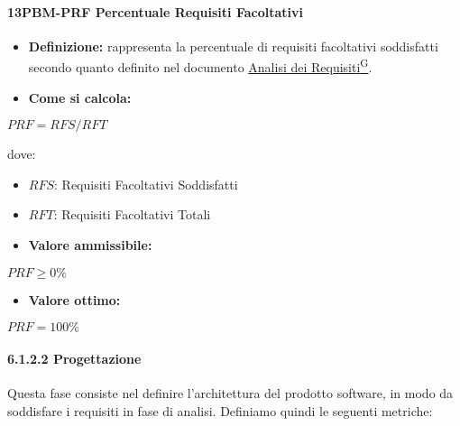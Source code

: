 \paragraph*{13PBM-PRF Percentuale Requisiti Facoltativi}
\begin{itemize}
    \item \textbf{Definizione:} rappresenta la percentuale di requisiti facoltativi soddisfatti secondo quanto definito nel documento \href{https://code7crusaders.github.io/docs/PB/documentazione_interna/glossario.html#analisi-dei-requisiti}{Analisi dei Requisiti\textsuperscript{G}}.
    \item \textbf{Come si calcola:}
\end{itemize}
\begin{center}
   $PRF = RFS/RFT$ 
\end{center}
dove:
\begin{itemize}[label=$\rightarrow$]
    \item $RFS$: Requisiti Facoltativi Soddisfatti
    \item $RFT$: Requisiti Facoltativi Totali
\end{itemize}
\begin{itemize}
    \item \textbf{Valore ammissibile:}
\end{itemize}
\begin{center}
    $PRF \geq 0\%$
\end{center}
\begin{itemize}
    \item \textbf{Valore ottimo:}
\end{itemize}
\begin{center}
    $PRF = 100\%$
\end{center}

\paragraph*{6.1.2.2 Progettazione}
Questa fase consiste nel definire l'architettura  del prodotto software, in modo da soddisfare i requisiti in fase di analisi. Definiamo quindi le seguenti metriche:


